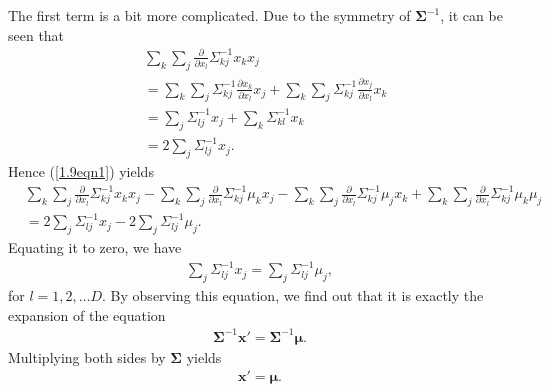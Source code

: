 \begin{answer}{}
\begin{comment}
		\left(\sum_k \Sigma_{kl}^{-1} x_k\right) - \Sigma_{ll}^{-1}x_l, &\mbox{$k \neq l$ and $j = l$}\\
		0, &\mbox{otherwise}.
		\end{cases}
		\end{equation}
		For the reason mentioned above, the second situation and the third situation in (\ref{1.9eqn2}) are equal. Therefore we have
		\begin{align}
		\sum_k \sum_j \frac{\partial}{\partial x_l} \Sigma_{kj}^{-1}x_k x_j = 2\sum_j \Sigma_{lj}^{-1} x_j.
		\end{align}
	\end{comment}
	The first term is a bit more complicated. Due to the symmetry of $\bm{\Sigma}^{-1}$, it can be seen that
	\begin{align}
		&\sum_k \sum_j \frac{\partial}{\partial x_l} \Sigma_{kj}^{-1}x_k x_j\\ 
		& = \sum_k \sum_j \Sigma_{kj}^{-1} \frac{\partial x_k}{\partial x_l}x_j + \sum_k \sum_j \Sigma_{kj}^{-1} \frac{\partial x_j}{\partial x_l}x_k\\
		& = \sum_j \Sigma_{lj}^{-1}x_j + \sum_k \Sigma_{kl}^{-1}x_k\\
		&= 2\sum_j \Sigma_{lj}^{-1}x_j.
	\end{align}
	Hence (\ref{1.9eqn1}) yields
	\begin{align}
		&\sum_k \sum_j \frac{\partial}{\partial x_l} \Sigma_{kj}^{-1}x_k x_j - \sum_k \sum_j \frac{\partial}{\partial x_l} \Sigma_{kj}^{-1} \mu_k x_j - \sum_k \sum_j \frac{\partial}{\partial x_l} \Sigma_{kj}^{-1} \mu_j x_k + \sum_k \sum_j \frac{\partial}{\partial x_l} \Sigma_{kj}^{-1} \mu_k \mu_j\\
		&= 2\sum_j \Sigma_{lj}^{-1} x_j - 2\sum_j \Sigma_{lj}^{-1} \mu_j.
	\end{align}
	Equating it to zero, we have
	\begin{align}
		\sum_j \Sigma_{lj}^{-1} x_j =\sum_j \Sigma_{lj}^{-1} \mu_j,
	\end{align}
	for $l = 1, 2, \ldots D$. By observing this equation, we find out that it is exactly the expansion of the equation
	\begin{align}
		\bm{\Sigma}^{-1}\bm{x'} = \bm{\Sigma}^{-1}\bm{\mu}.
	\end{align}
	Multiplying both sides by $\bm{\Sigma}$ yields
	\begin{align}
		\bm{x'} = \bm{\mu}.
	\end{align}
\end{answer}
